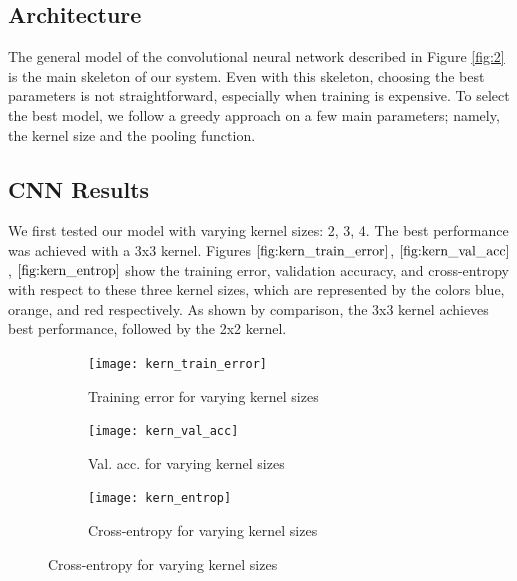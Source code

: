 \documentclass[10pt, twocolumn, twoside]{article}
\newcommand{\squeezeup}{\vspace{-2.5mm}}
\begin{document}
\subsection{Architecture}
\squeezeup
The general model of the convolutional neural network described in Figure \ref{fig:2} is the main skeleton of our system.  Even with this skeleton, choosing the best parameters is not straightforward, especially when training is expensive. To select the best model, we follow a greedy approach on a few main parameters; namely, the kernel size and the pooling function. 

\subsection{CNN Results}
\squeezeup
We first tested our model with varying kernel sizes: 2, 3, 4. The best performance was achieved with a 3x3 kernel. Figures $\ref{fig:kern_train_error}$, $\ref{fig:kern_val_acc}$, $\ref{fig:kern_entrop}$ show the training error, validation accuracy, and cross-entropy with respect to these three kernel sizes, which are represented by the colors blue, orange, and red respectively. As shown by comparison, the 3x3 kernel achieves best performance, followed by the 2x2 kernel. 


\begin{figure}[h]
    \centering
    \begin{subfigure}
        \centering
        \texttt{[image: kern\_train\_error]}
        \caption{Training error for varying kernel sizes}
        \label{fig:kern_train_error}
    \end{subfigure}
    \vspace{3mm}
    \begin{subfigure}
        \centering
        \texttt{[image: kern\_val\_acc]}
        \caption{Val. acc. for varying kernel sizes}
        \label{fig:kern_val_acc}
    \end{subfigure}
    \vspace{3mm}
    \begin{subfigure}
        \centering
        \texttt{[image: kern\_entrop]}
        \caption{Cross-entropy for varying kernel sizes}
        \label{fig:kern_entrop}
    \end{subfigure}
    \label{fig:different_kernel}
\end{figure}
\end{document}
